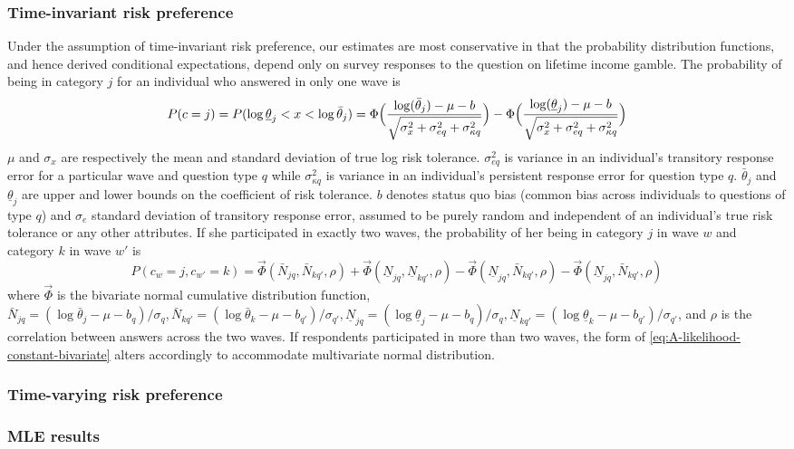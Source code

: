 \documentclass[]{article}
\begin{document}
\subsubsection{Time-invariant risk preference}
Under the assumption of time-invariant risk preference, our estimates are most conservative in that the probability distribution functions, and hence derived conditional expectations, depend only on survey responses to the question on lifetime income gamble. The probability of being in category $j$ for an individual who answered in only one wave is 
\begin{equation}
P(c=j)=P(\log\underline{\theta}_j<x<\log\bar{\theta}_j)=\Phi\Big({\log(\bar{\theta}_j)-\mu-b\over\sqrt{\sigma_x^2+\sigma_{eq}^2+\sigma_{\kappa q}^2}}\Big)-\Phi\Big({\log(\underline{\theta}_j)-\mu-b\over\sqrt{\sigma_x^2+\sigma_{eq}^2+\sigma_{\kappa q}^2}}\Big) 
\label{eq:A-likelihood-constant-univariate}	
\end{equation}
$\mu$ and $\sigma_x$ are respectively the mean and standard deviation of true log risk tolerance. $\sigma_{eq}^2$ is variance in an individual's transitory response error for a particular wave and question type $q$ while $\sigma_{\kappa q}^2$ is variance in an individual's persistent response error for question type $q$. $\bar \theta_j$ and $\underline{\theta}_j$ are upper and lower bounds on the coefficient of risk tolerance. $b$ denotes status quo bias (common bias across individuals to questions of type $q$) and $\sigma_e$ standard deviation of transitory response error, assumed to be purely random and independent of an individual's true risk tolerance or any other attributes. If she participated in exactly two waves, the probability of her being in category $j$ in wave $w$ and category $k$ in wave $w'$ is
\begin{equation}
P(c_w=j, c_{w'}=k)=\vec{\Phi}(\bar N_{jq}, \bar N_{kq'},\rho)+\vec{\Phi}(\underline N_{jq}, \underline N_{kq'},\rho)-\vec{\Phi}(\underline N_{jq}, \bar N_{kq'},\rho)-\vec{\Phi}(\underline N_{jq}, \bar N_{kq'},\rho)
\label{eq:A-likelihood-constant-bivariate}
\end{equation}
where $\vec{\Phi}$ is the bivariate normal cumulative distribution function, $\bar N_{jq}=(\log \bar \theta_j-\mu-b_q)/\sigma_q,\bar N_{kq'}=(\log \bar \theta_k-\mu-b_{q'})/\sigma_{q'}, \underline N_{jq}=(\log \underline \theta_j-\mu-b_q)/\sigma_q, \underline N_{kq'}=(\log \underline \theta_k-\mu-b_{q'})/\sigma_{q'}$, and $\rho$ is the correlation between answers across the two waves. If respondents participated in more than two waves, the form of \eqref{eq:A-likelihood-constant-bivariate} alters accordingly to accommodate multivariate normal distribution.

\subsubsection{Time-varying risk preference}



\subsubsection{MLE results}
\end{document}
